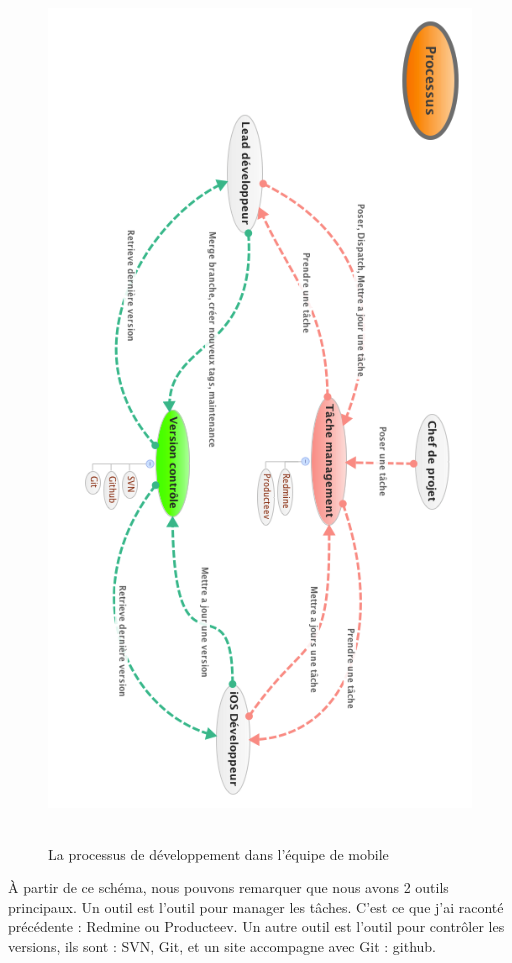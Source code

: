 \begin{figure}[htbp]
	\centering
		\includegraphics[height=9in]{XMinds/ProcessusMobile.png}
	\caption{La processus de développement dans l'équipe de mobile}
	\label{fig:XMinds_ProcessusMobile}
\end{figure}


À partir de ce schéma, nous pouvons remarquer que nous avons 2 outils principaux. Un outil est l'outil pour manager les tâches. C'est ce que j'ai raconté précédente : Redmine ou Producteev. Un autre outil est l'outil pour contrôler les versions, ils sont : SVN, Git, et un site accompagne avec Git : github. 

